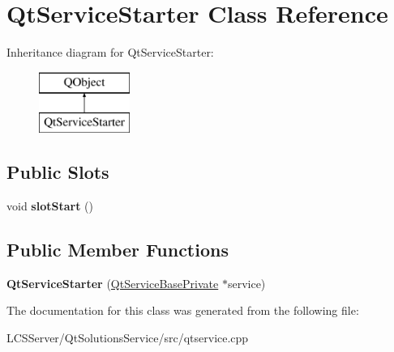 \hypertarget{class_qt_service_starter}{}\section{Qt\+Service\+Starter Class Reference}
\label{class_qt_service_starter}
Inheritance diagram for Qt\+Service\+Starter\+:\begin{figure}[H]
\begin{center}
\leavevmode
\includegraphics[height=2.000000cm]{class_qt_service_starter}
\end{center}
\end{figure}
\subsection*{Public Slots}
\begin{DoxyCompactItemize}
\item 
\mbox{\label{class_qt_service_starter_adfd8ef0a999b55ca6eeefafee52cf8dc}} 
void {\bfseries slot\+Start} ()
\end{DoxyCompactItemize}
\subsection*{Public Member Functions}
\begin{DoxyCompactItemize}
\item 
\mbox{\label{class_qt_service_starter_ac192dd9044e8ff6a663a456d88e16fdc}} 
{\bfseries Qt\+Service\+Starter} (\hyperlink{class_qt_service_base_private}{Qt\+Service\+Base\+Private} $\ast$service)
\end{DoxyCompactItemize}


The documentation for this class was generated from the following file\+:\begin{DoxyCompactItemize}
\item 
L\+C\+S\+Server/\+Qt\+Solutions\+Service/src/qtservice.\+cpp\end{DoxyCompactItemize}
